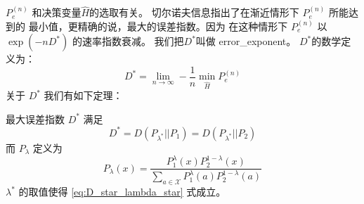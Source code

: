 $P_e^{(n)}$ 和决策变量$\widehat{H}$的选取有关。
切尔诺夫信息指出了在渐近情形下 $P_e^{(n)}$ 所能达到的
最小值，更精确的说，最大的误差指数。因为
在这种情形下 $P_e^{(n)}$ 以 $\exp(-n D^*)$ 的速率指数衰减。
我们把$D^*$叫做 \gls{error_exponent}。
$D^*$的数学定义为：
\begin{equation}
 D^* = \lim_{n\to \infty} -\frac{1}{n} \min_{\widehat{H}}
 P^{(n)}_e
\end{equation}
关于 $D^*$ 我们有如下定理：
\begin{theorem}
  最大误差指数 $D^*$ 满足
  \begin{equation}\label{eq:D_star_lambda_star}
    D^* = D(P_{\lambda^*} || P_1) = D(P_{\lambda^*}|| P_2)
  \end{equation}
  而 $P_{\lambda}$ 定义为
  \begin{equation}
    P_{\lambda}(x) = \frac{P^{\lambda}_1 (x) P^{1-\lambda}_2 (x)}
    {\sum_{a \in \mathcal{X}} P^{\lambda}_1 (a) P^{1-\lambda}_2 (a)}
  \end{equation}
  $\lambda^*$ 的取值使得  \eqref{eq:D_star_lambda_star} 式成立。
\end{theorem}




